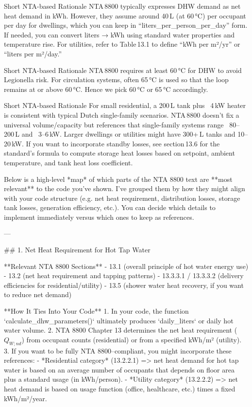 Short NTA-based Rationale
NTA 8800 typically expresses DHW demand as net heat demand in kWh. However, they assume around 40 L (at 60 °C) per occupant per day for dwellings, which you can keep in “liters_per_person_per_day” form. If needed, you can convert liters → kWh using standard water properties and temperature rise. For utilities, refer to Table 13.1 to define “kWh per m²/yr” or “liters per m²/day.”



Short NTA-based Rationale
NTA 8800 requires at least 60 °C for DHW to avoid Legionella risk. For circulation systems, often 65 °C is used so that the loop remains at or above 60 °C. Hence we pick 60 °C or 65 °C accordingly.



Short NTA-based Rationale
For small residential, a 200 L tank plus ~4 kW heater is consistent with typical Dutch single-family scenarios. NTA 8800 doesn’t fix a universal volume/capacity but references that single-family systems range ~80–200 L and ~3–6 kW. Larger dwellings or utilities might have 300+ L tanks and 10–20 kW. If you want to incorporate standby losses, see section 13.6 for the standard’s formula to compute storage heat losses based on setpoint, ambient temperature, and tank heat loss coefficient.




Below is a high-level *map* of which parts of the NTA 8800 text are **most relevant** to the code you’ve shown. I’ve grouped them by how they might align with your code structure (e.g. net heat requirement, distribution losses, storage tank losses, generation efficiency, etc.). You can decide which details to implement immediately versus which ones to keep as references. 

---

## 1. Net Heat Requirement for Hot Tap Water

**Relevant NTA 8800 Sections**  
- 13.1 (overall principle of hot water energy use)  
- 13.2 (net heat requirement and tapping patterns)  
- 13.3.3.1 / 13.3.3.2 (delivery efficiencies for residential/utility)  
- 13.5 (shower water heat recovery, if you want to reduce net demand)  

**How It Ties Into Your Code**  
1. In your code, the function `calculate_dhw_parameters()` ultimately produces `daily_liters` or daily hot water volume.  
2. NTA 8800 Chapter 13 determines the net heat requirement (\(Q_{W;nd}\)) from occupant counts (residential) or from a specified kWh/m² (utility).  
3. If you want to be fully NTA 8800–compliant, you might incorporate these references:  
   - *Residential category* (13.2.2.1) => net heat demand for hot tap water is based on an average number of occupants that depends on floor area plus a standard usage (in kWh/person).  
   - *Utility category* (13.2.2.2) => net heat demand is based on usage function (office, healthcare, etc.) times a fixed kWh/m²/year.  

